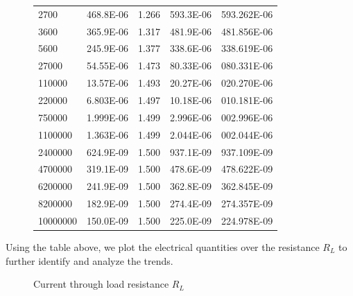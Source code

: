 \documentclass[12pt]{article}
\begin{document}
\begin{figure}[H]
\begin{center}
\begin{tabular}{ P{2.5cm}|P{2.5cm} P{2.5cm} P{2.5cm} P{2.5cm} }
            2700             & 468.8E-06 & 1.266      & 593.3E-06  & 593.262E-06        \\
            3600             & 365.9E-06 & 1.317      & 481.9E-06  & 481.856E-06        \\
            5600             & 245.9E-06 & 1.377      & 338.6E-06  & 338.619E-06        \\
            27000            & 54.55E-06 & 1.473      & 80.33E-06  & 080.331E-06        \\
            110000           & 13.57E-06 & 1.493      & 20.27E-06  & 020.270E-06        \\
            220000           & 6.803E-06 & 1.497      & 10.18E-06  & 010.181E-06        \\
            750000           & 1.999E-06 & 1.499      & 2.996E-06  & 002.996E-06        \\
            1100000          & 1.363E-06 & 1.499      & 2.044E-06  & 002.044E-06        \\
            2400000          & 624.9E-09 & 1.500      & 937.1E-09  & 937.109E-09        \\
            4700000          & 319.1E-09 & 1.500      & 478.6E-09  & 478.622E-09        \\
            6200000          & 241.9E-09 & 1.500      & 362.8E-09  & 362.845E-09        \\
            8200000          & 182.9E-09 & 1.500      & 274.4E-09  & 274.357E-09        \\
            10000000         & 150.0E-09 & 1.500      & 225.0E-09  & 224.978E-09        \\

            \hline
        \end{tabular}
    \end{center}
\end{figure}
Using the table above, we plot the electrical quantities over the resistance $R_L$ to further identify and analyze the trends.
\begin{figure}[H]
    \centering
    \caption[12pt]{Current through load resistance $R_L$}
\end{figure}
\end{document}
